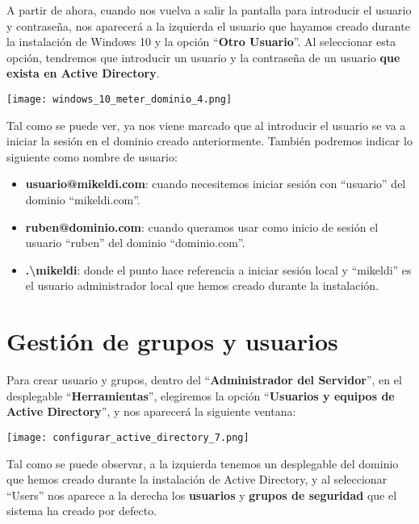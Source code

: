 A partir de ahora, cuando nos vuelva a salir la pantalla para introducir el usuario y contraseña, nos aparecerá a la izquierda el usuario que hayamos creado durante la instalación de Windows 10 y la opción “\textbf{Otro Usuario}”. Al seleccionar esta opción, tendremos que introducir un usuario y la contraseña de un usuario \textbf{que exista en Active Directory}.

\begin{center}
    \texttt{[image: windows\_10\_meter\_dominio\_4.png]}
\end{center}

Tal como se puede ver, ya nos viene marcado que al introducir el usuario se va a iniciar la sesión en el dominio creado anteriormente. También podremos indicar lo siguiente como nombre de usuario:

\begin{itemize}
    \item \textbf{usuario@mikeldi.com}: cuando necesitemos iniciar sesión con “usuario” del dominio “mikeldi.com”.
    \item \textbf{ruben@dominio.com}: cuando queramos usar como inicio de sesión el usuario “ruben” del dominio “dominio.com”.
    \item \textbf{.\textbackslash{mikeldi}}: donde el punto hace referencia a iniciar sesión local y “mikeldi” es el usuario administrador local que hemos creado durante la instalación.
\end{itemize}

\chapter{Gestión de grupos y usuarios}
Para crear usuario y grupos, dentro del “\textbf{Administrador del Servidor}”, en el desplegable “\textbf{Herramientas}”, elegiremos la opción “\textbf{Usuarios y equipos de Active Directory}”, y nos aparecerá la siguiente ventana:

\begin{center}
    \vspace{-15pt}
    \texttt{[image: configurar\_active\_directory\_7.png]}
\end{center}

Tal como se puede observar, a la izquierda tenemos un desplegable del dominio que hemos creado durante la instalación de Active Directory, y al seleccionar “Users” nos aparece a la derecha los \textbf{usuarios}  y \textbf{grupos de seguridad} que el sistema ha creado por defecto.

